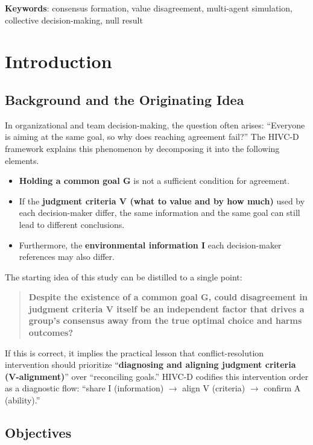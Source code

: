 \documentclass[11pt]{article}
\begin{document}
\noindent\textbf{Keywords}: consensus formation, value disagreement, multi-agent simulation, collective decision-making, null result

\section{Introduction}

\subsection{Background and the Originating Idea}

In organizational and team decision-making, the question often arises: ``Everyone is aiming at the same goal, so why does reaching agreement fail?'' The HIVC-D framework explains this phenomenon by decomposing it into the following elements.

\begin{itemize}[nosep]
  \item \textbf{Holding a common goal G} is not a sufficient condition for agreement.
  \item If the \textbf{judgment criteria V (what to value and by how much)} used by each decision-maker differ, the same information and the same goal can still lead to different conclusions.
  \item Furthermore, the \textbf{environmental information I} each decision-maker references may also differ.
\end{itemize}

The starting idea of this study can be distilled to a single point:

\begin{quote}
\textbf{Despite the existence of a common goal G, could disagreement in judgment criteria V itself be an independent factor that drives a group's consensus away from the true optimal choice and harms outcomes?}
\end{quote}

If this is correct, it implies the practical lesson that conflict-resolution intervention should prioritize ``\textbf{diagnosing and aligning judgment criteria (V-alignment)}'' over ``reconciling goals.'' HIVC-D codifies this intervention order as a diagnostic flow: ``share I (information) $\to$ align V (criteria) $\to$ confirm A (ability).''

\subsection{Objectives}
\end{document}
